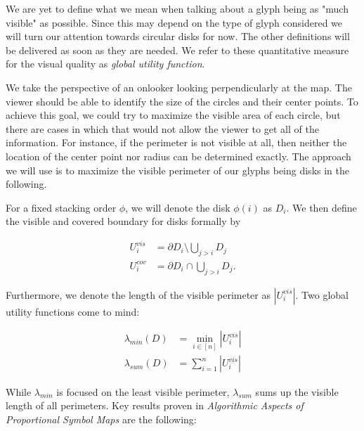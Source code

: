 \documentclass[a4paper,11pt]{article}
\begin{document}
We are yet to define what we mean when talking about a glyph being as "much visible" as possible. Since this may depend on the type of glyph considered we will turn our attention towards circular disks for now. The other definitions will be delivered as soon as they are needed. We refer to these quantitative measure for the visual quality as \textit{global utility function}.

We take the perspective of an onlooker looking perpendicularly at the map. The viewer should be able to identify the size of the circles and their center points. To achieve this goal, we could try to maximize the visible area of each circle, but there are cases in which that would not allow the viewer to get all of the information. For instance, if the perimeter is not visible at all, then neither the location of the center point nor radius can be determined exactly. The approach we will use is to maximize the visible perimeter of our glyphs being disks in the following.


For a fixed stacking order $\phi$, we will denote the disk $\phi(i)$ as $D_i$. We then define the visible and covered boundary for disks formally by

\begin{align*}
  U_i^{vis} & =\partial D_i\setminus \bigcup_{j>i} D_{j} \\
  U_i^{cov} & =\partial D_i \cap \bigcup_{j>i} D_{j}.
\end{align*}

Furthermore, we denote the length of the visible perimeter as $|U^{vis}_i|$. Two global utility functions come to mind:

\begin{align*}
  \lambda_{min} (D) & = \min_{i \in [n]}|U_i^{vis}| \\
  \lambda_{sum} (D) & = \sum_{i=1}^n|U_i^{vis}|
\end{align*}

While $\lambda_{min}$ is focused on the least visible perimeter, $\lambda_{sum}$ sums up the visible length of all perimeters. Key results proven in \textit{Algorithmic Aspects of Proportional Symbol Maps} are the following:
\end{document}

